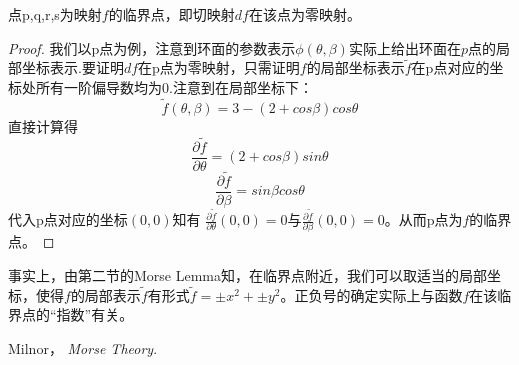 \documentclass[a4paper]{ctexart}
\begin{document}
\begin{theorem}

点p,q,r,s为映射$f$的临界点，即切映射$df$在该点为零映射。
\begin{proof}
我们以p点为例，注意到环面的参数表示$\phi(\theta,\beta)$实际上给出环面在$p$点的局部坐标表示.要证明$df$在p点为零映射，只需证明$f$的局部坐标表示$\widetilde{f}$在p点对应的坐标处所有一阶偏导数均为0.注意到在局部坐标下：
$$
\widetilde{f}(\theta,\beta)=3-(2+cos\beta)cos\theta
$$
直接计算得
$$
\frac{\partial \widetilde{f}}{\partial \theta}=(2+cos\beta)sin\theta
$$
$$
\frac{\partial \widetilde{f}}{\partial \beta}=sin\beta cos\theta
$$
代入p点对应的坐标$(0,0)$知有
$\frac{\partial \widetilde{f}}{\partial \theta}(0,0)=0$与$\frac{\partial \widetilde{f}}{\partial \beta}(0,0)=0$。从而p点为$f$的临界点。
\end{proof}
\end{theorem}

\begin{remark}
事实上，由第二节的Morse Lemma知，在临界点附近，我们可以取适当的局部坐标，使得$f$的局部表示$\widetilde{f}$有形式$\widetilde{f}=\pm x^2+\pm y^2$。正负号的确定实际上与函数$f$在该临界点的“指数”有关。
\end{remark}


\begin{thebibliography}{9}
\bibitem{}
  Milnor，
   \emph{Morse Theory}.

\end{thebibliography}
\end{document}
